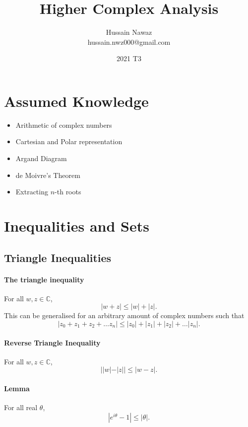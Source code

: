 \documentclass[12pt, letterpaper]{article}
\title{Higher Complex Analysis}
\author{Hussain Nawaz \\ hussain.nwz000@gmail.com}
\date{2021 T3}
\begin{document}
\maketitle
\tableofcontents
\newpage

    \section{Assumed Knowledge}
    \begin{itemize}
        \item Arithmetic of complex numbers
        \item Cartesian and Polar representation
        \item Argand Diagram
        \item de Moivre's Theorem
        \item Extracting \(n\)-th roots
    \end{itemize}


    \section{Inequalities and Sets}
    \subsection{Triangle Inequalities}
    \paragraph{The triangle inequality} For all \(w, z\in \mathbb{C}\),
    \[ |w + z| \leq |w| + |z|.\]
    This can be generalised for an arbitrary amount of complex numbers such that
    \[|z_0 + z_1 + z_2 + \dots z_n| \leq |z_0| + |z_1| + |z_2| + \dots |z_n|.\]

    \paragraph{Reverse Triangle Inequality}
    For all \(w, z\in \mathbb{C}\),
    \[||w|-|z|| \leq |w-z|.\]
   
    \paragraph{Lemma} For all real \(\theta\),
    \[|e^{i\theta} - 1 | \leq |\theta|.\]
\end{document}
